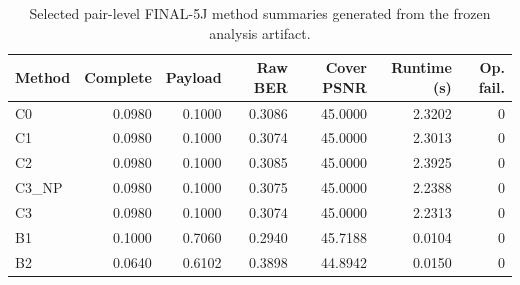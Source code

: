 \begin{table}[t]
\centering
\caption{Selected pair-level FINAL-5J method summaries generated from the frozen analysis artifact.}
\label{tab:5j-main-summary}
\begingroup\scriptsize\setlength{\tabcolsep}{4pt}
\begin{tabular}{lrrrrrr}
\toprule
Method & Complete & Payload & Raw BER & Cover PSNR & Runtime (s) & Op. fail. \\
\midrule
C0 & 0.0980 & 0.1000 & 0.3086 & 45.0000 & 2.3202 & 0 \\
C1 & 0.0980 & 0.1000 & 0.3074 & 45.0000 & 2.3013 & 0 \\
C2 & 0.0980 & 0.1000 & 0.3085 & 45.0000 & 2.3925 & 0 \\
C3\_NP & 0.0980 & 0.1000 & 0.3075 & 45.0000 & 2.2388 & 0 \\
C3 & 0.0980 & 0.1000 & 0.3074 & 45.0000 & 2.2313 & 0 \\
B1 & 0.1000 & 0.7060 & 0.2940 & 45.7188 & 0.0104 & 0 \\
B2 & 0.0640 & 0.6102 & 0.3898 & 44.8942 & 0.0150 & 0 \\
\bottomrule
\end{tabular}
\endgroup
\end{table}
